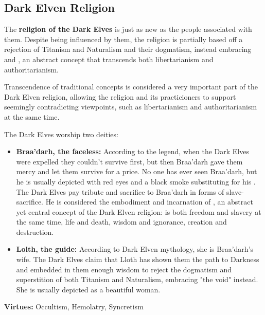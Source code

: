 \subsection{Dark Elven Religion}


The \textbf{religion of the Dark Elves} is just as new as the people associated with them. Despite being influenced by them, the religion is partially based off a rejection of Titanism and Naturalism and their dogmatism, instead embracing  and , an abstract concept that transcends both libertarianism and authoritarianism.

Transcendence of traditional concepts is considered a very important part of the Dark Elven religion, allowing the religion and its practicioners to support seemingly contradicting viewpoints, such as libertarianism  and authoritarianism  at the same time. 

The Dark Elves worship two deities:
\begin{itemize}
  \item \textbf{Braa'darh, the faceless:} According to the legend, when the Dark Elves were expelled they couldn’t survive first, but then Braa'darh gave them mercy and let them survive for a price. No one has ever seen Braa'darh, but he is usually depicted with red eyes and a black smoke substituting for his . The Dark Elves pay tribute and sacrifice to Braa'darh in forms of slave-sacrifice. He is considered the embodiment and incarnation of , an abstract yet central concept of the Dark Elven religion:  is both freedom and slavery at the same time, life and death, wisdom and ignorance, creation and destruction. 
  \item \textbf{Lolth, the guide:} According to Dark Elven mythology, she is Braa'darh's wife. The Dark Elves claim that Lloth has shown them the path to Darkness and embedded in them enough wisdom to reject the dogmatism and superstition of both Titanism and Naturalism, embracing "the void" instead. She is usually depicted as a beautiful woman.
\end{itemize}

\textbf{Virtues:} Occultism, Hemolatry, Syncretism

